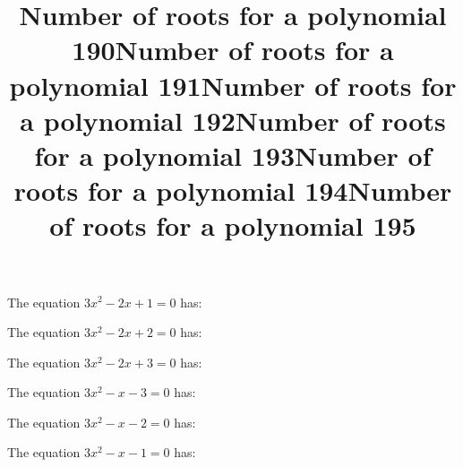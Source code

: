 \documentclass{article}
\begin{document}
\begin{category}
\begin{question}[multichoice]


\end{question}
\begin{question}[multichoice]
\title{Number of roots for a polynomial 190}
The equation $3 x^{2} - 2 x + 1=0$ has:



\end{question}
\begin{question}[multichoice]
\title{Number of roots for a polynomial 191}
The equation $3 x^{2} - 2 x + 2=0$ has:



\end{question}
\begin{question}[multichoice]
\title{Number of roots for a polynomial 192}
The equation $3 x^{2} - 2 x + 3=0$ has:



\end{question}
\begin{question}[multichoice]
\title{Number of roots for a polynomial 193}
The equation $3 x^{2} - x - 3=0$ has:



\end{question}
\begin{question}[multichoice]
\title{Number of roots for a polynomial 194}
The equation $3 x^{2} - x - 2=0$ has:



\end{question}
\begin{question}[multichoice]
\title{Number of roots for a polynomial 195}
The equation $3 x^{2} - x - 1=0$ has:




\end{question}
\end{category}
\end{document}
